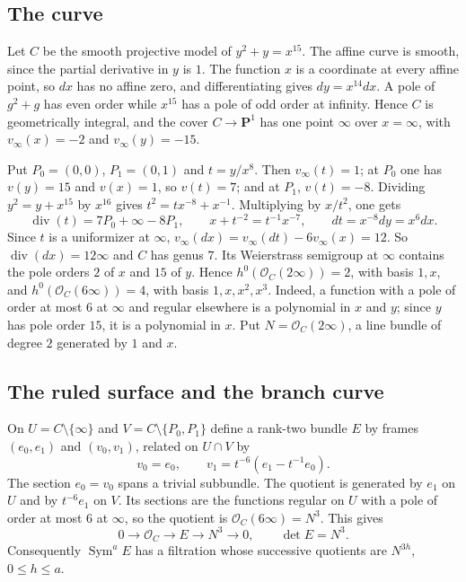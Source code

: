 \documentclass[11pt,a4paper]{article}
\theoremstyle{plain}
\theoremstyle{remark}
\newcommand{\OO}{\mathcal O}
\newcommand{\PP}{\mathbf P}
\newcommand{\Sym}{\operatorname{Sym}}
\begin{document}
\subsection{The curve}
Let $C$ be the smooth projective model of $y^2+y=x^{15}$. The affine curve is smooth, since the partial derivative in
$y$ is $1$. The function $x$ is a coordinate at every affine point, so $dx$ has no affine zero, and differentiating gives
$dy=x^{14}dx$. A pole of $g^2+g$ has even order while $x^{15}$ has a pole of odd order at infinity. Hence $C$ is
geometrically integral, and the cover $C\to\PP^1$ has one point $\infty$ over $x=\infty$, with $v_\infty(x)=-2$ and
$v_\infty(y)=-15$.

Put $P_0=(0,0)$, $P_1=(0,1)$ and $t=y/x^8$. Then $v_\infty(t)=1$; at $P_0$ one has $v(y)=15$ and $v(x)=1$, so $v(t)=7$;
and at $P_1$, $v(t)=-8$. Dividing $y^2=y+x^{15}$ by $x^{16}$ gives $t^2=t x^{-8}+x^{-1}$. Multiplying by $x/t^2$, one
gets
\begin{equation}\label{eq:curve}
 \operatorname{div}(t)=7P_0+\infty-8P_1,\qquad x+t^{-2}=t^{-1}x^{-7},\qquad dt=x^{-8}dy=x^6dx .
\end{equation}
Since $t$ is a uniformizer at $\infty$, $v_\infty(dx)=v_\infty(dt)-6v_\infty(x)=12$. So $\operatorname{div}(dx)=12\infty$ and
$C$ has genus $7$. Its Weierstrass semigroup at $\infty$ contains the pole orders $2$ of $x$ and $15$ of $y$. Hence
$h^0(\OO_C(2\infty))=2$, with basis $1,x$, and $h^0(\OO_C(6\infty))=4$, with basis $1,x,x^2,x^3$. Indeed, a function with
a pole of order at most $6$ at $\infty$ and regular elsewhere is a polynomial in $x$ and $y$; since $y$ has pole order
$15$, it is a polynomial in $x$. Put $N=\OO_C(2\infty)$, a line bundle of degree $2$ generated by $1$ and $x$.

\subsection{The ruled surface and the branch curve}
On $U=C\setminus\{\infty\}$ and $V=C\setminus\{P_0,P_1\}$ define a rank-two bundle $E$ by frames $(e_0,e_1)$ and
$(v_0,v_1)$, related on $U\cap V$ by
\[
 v_0=e_0,\qquad v_1=t^{-6}(e_1-t^{-1}e_0).
\]
The section $e_0=v_0$ spans a trivial subbundle. The quotient is generated by $e_1$ on $U$ and by $t^{-6}e_1$ on $V$. Its
sections are the functions regular on $U$ with a pole of order at most $6$ at $\infty$, so the quotient is
$\OO_C(6\infty)=N^3$. This gives
\[
 0\to\OO_C\to E\to N^3\to0,\qquad\det E=N^3 .
\]
Consequently $\Sym^aE$ has a filtration whose successive quotients are $N^{3h}$, $0\le h\le a$.
\end{document}
